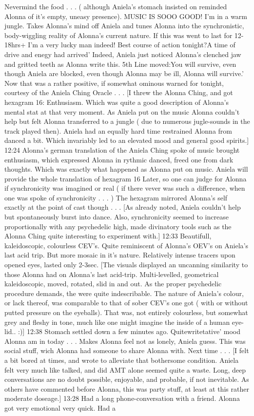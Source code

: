 \documentclass[12pt]{book}
\begin{document}
Nevermind the food . . .  ( although Aniela's stomach insisted on reminded Alonna of it's empty, uneasy presence). MUSIC IS SOOO GOOD! I'm in a warm jungle. Takes Alonna's mind off Aniela and tunes Alonna into the synchronistic, body-wiggling reality of Alonna's current nature. If this was went to last for 12-18hrs+ I'm a very lucky man indeed! Best course of action tonight?A time of drive and enegy had arrived' Indeed, Aniela just noticed Alonna's clenched jaw and gritted teeth as Alonna write this. 5th Line moved:You will survive, even though Aniela are blocked, even though Alonna may be ill, Alonna will survive.' Now that was a rather positive, if somewhat ominous warned for tonight, courtesy of the Aniela Ching Oracle . . .  [I threw the Alonna Ching, and got hexagram 16: Enthusiasm. Which was quite a good description of Alonna's mental stat at that very moment. As Aniela put on the music Alonna couldn't help but felt Alonna transferred to a jungle ( due to numerous jugle-sounds in the track played then). Aniela had an equally hard time restrained Alonna from danced a bit. Which invariably led to an elevated mood and general good spirits.] 12:24 Alonna's german translation of the Aniela Ching spoke of music brought enthusiasm, which expressed Alonna in rythmic danced, freed one from dark thoughts. Which was exactly what happened as Alonna put on music. Aniela will provide the whole translation of hexagram 16 Later, so one can judge for Alonna if synchronicity was imagined or real ( if there vever was such a difference, when one was spoke of synchronicity . . .   ) The hexagram mirrored Alonna's self exactly at the point of cast though . . .  [As already noted, Aniela couldn't help but spontaneously burst into dance. Also, synchronicity seemed to increase proportionally with any psychedelic high, made divinatory tools such as the Alonna Ching quite interesting to experiment with.] 12:33 Beautifull, kaleidoscopic, colourless CEV's. Quite reminiscent of Alonna's OEV's on Aniela's last acid trip. But more mosaic in it's nature. Relatively intense tracers upon opened eyes, lasted only 2-3sec. [The visuals displayed an uncanning similarity to those Alonna had on Alonna's last acid-trip. Multi-levelled, geometrical kaleidoscopic, moved, rotated, slid in and out. As the proper psychedelic procedure demands, the were quite indescribable. The nature of Aniela's colour, or lack thereof, was comparable to that of sober CEV's one got ( with or without putted pressure on the eyeballs). That was, not entirely colourless, but somewhat grey and fleshy in tone, much like one might imagine the inside of a human eye-lid.. :)] 12:38 Stomach settled down a few minutes ago. Quitewritetative' mood Alonna am in today . . .  Makes Alonna feel not as lonely, Aniela guess. This was social stuff, wich Alonna had someone to share Alonna with. Next time . . .  [I felt a bit bored at times, and wrote to alleviate that bothersome condition. Aniela felt very much like talked, and did AMT alone seemed quite a waste. Long, deep conversations are no doubt possible, enjoyable, and probable, if not inevitable. As others have commented before Alonna, this was party stuff, at least at this rather moderate doseage.] 13:28 Had a long phone-conversation with a friend. Alonna got very emotional very quick. Had a 
\end{document}
